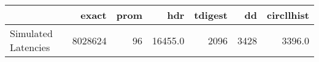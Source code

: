 \begin{tabular}{lrrrrrr}
\toprule
{} &    exact &  prom &      hdr &  tdigest &    dd &  circllhist \\
\midrule
Simulated Latencies &  8028624 &    96 &  16455.0 &     2096 &  3428 &      3396.0 \\
\bottomrule
\end{tabular}
